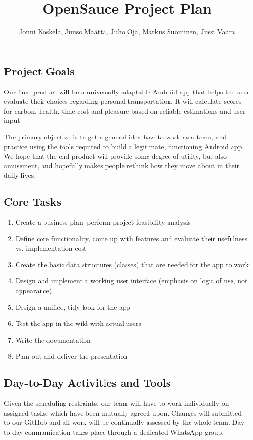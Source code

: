 \documentclass[english]{article}
\title{OpenSauce Project Plan}
\author{Jonni Koskela, Juuso Määttä, Juho Oja, Markus Suominen, Jussi Vaara}
\begin{document}
\maketitle

\subsection*{Project Goals}

Our final product will be a universally adaptable Android app that helps the
user evaluate their choices regarding personal transportation. It will
calculate scores for carbon, health, time cost and pleasure based on reliable
estimations and user input.

The primary objective is to get a general idea how to work as a team, and
practice using the tools required to build a legitimate, functioning
Android app. We hope that the end product will provide some degree of utility, but
also amusement, and hopefully makes people rethink how they move about in their
daily lives.

\subsection*{Core Tasks}

\begin{enumerate}
\item Create a business plan, perform project feasibility analysis
\item Define core functionality, come up with features and evaluate their
   usefulness vs. implementation cost
\item Create the basic data structures (classes) that are needed for the app to work
\item Design and implement a working user interface (emphasis on logic of use, not appearance)
\item Design a unified, tidy look for the app
\item Test the app in the wild with actual users
\item Write the documentation
\item Plan out and deliver the presentation
\end{enumerate}

\subsection*{Day-to-Day Activities and Tools}

Given the scheduling restraints, our team will have to work individually on
assigned tasks, which have been mutually agreed upon. Changes will submitted to
our GitHub and all work will be continually assessed by the whole team. Day-to-day
communication takes place through a dedicated WhatsApp group.
\end{document}
